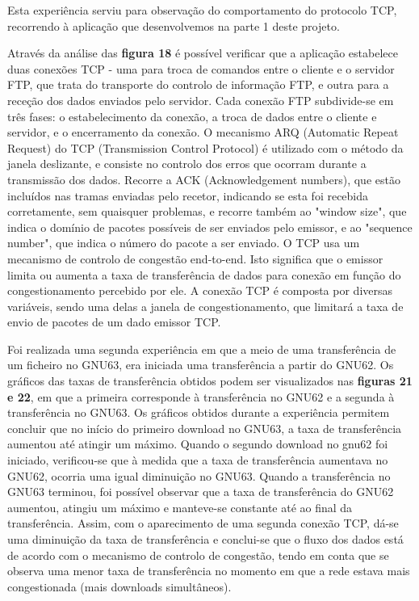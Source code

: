 \documentclass[article, a4paper, 11pt, oneside]{memoir}
\begin{document}
Esta experiência serviu para observação do comportamento do protocolo TCP, 
recorrendo à aplicação que desenvolvemos na parte 1 deste projeto. 

Através da análise das \textbf{figura 18} é possível verificar que a aplicação estabelece duas conexões TCP - 
uma para troca de comandos entre o cliente e o servidor FTP, 
que trata do transporte do controlo de informação FTP, e outra para a receção dos dados enviados pelo servidor.
Cada conexão FTP subdivide-se em três fases: o estabelecimento da conexão, a troca de dados entre o cliente e servidor, e o encerramento da conexão.
O mecanismo ARQ (Automatic Repeat Request) do TCP (Transmission Control Protocol) é utilizado com o método da janela deslizante, 
e consiste no controlo dos erros que ocorram durante a transmissão dos dados.
Recorre a ACK (Acknowledgement numbers), que estão incluídos nas tramas enviadas pelo recetor, indicando se esta foi 
recebida corretamente, sem quaisquer problemas, e recorre também ao "window size", que indica o domínio de pacotes 
possíveis de ser enviados pelo emissor, e ao "sequence number", que indica o número do pacote a ser enviado.
O TCP usa um mecanismo de controlo de congestão end-to-end. Isto significa que o emissor limita ou aumenta a taxa de 
transferência de dados para conexão em função do congestionamento percebido por ele.
A conexão TCP é composta por diversas variáveis, sendo uma delas a janela de congestionamento, que limitará a taxa de envio de pacotes de um dado emissor TCP.

Foi realizada uma segunda experiência em que a meio de uma transferência de um ficheiro no GNU63, 
era iniciada uma transferência a partir do GNU62. Os gráficos das taxas de transferência
obtidos podem ser visualizados nas \textbf{figuras 21 e 22}, em que a primeira corresponde à transferência no GNU62 e a segunda à transferência no GNU63.
Os gráficos obtidos durante a experiência permitem concluir que no início do primeiro download no GNU63, a taxa de transferência aumentou até atingir um máximo. 
Quando o segundo download no gnu62 foi iniciado, verificou-se que à medida que a taxa de transferência aumentava no GNU62, ocorria uma igual diminuição no GNU63. 
Quando a transferência no GNU63
terminou, foi possível observar que a taxa de transferência do GNU62 aumentou, atingiu um máximo e manteve-se constante até ao final da transferência.
Assim, com o aparecimento de uma segunda conexão TCP, dá-se uma diminuição da taxa de transferência e conclui-se que o fluxo dos dados está de acordo 
com o mecanismo de controlo de congestão, tendo em conta que se observa uma menor taxa de transferência no momento em que a rede estava mais congestionada 
(mais downloads simultâneos).
\end{document}
